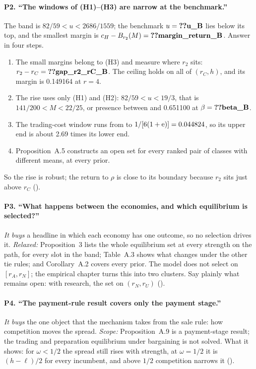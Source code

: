 \paragraph{P2. ``The windows of (H1)--(H3) are narrow at the benchmark.''}
The band is \(82/59<u<2686/1559\); the benchmark \(u=\reg{u_B}\) lies  below its top, and the
smallest margin is \(c_H-B_{r_2}(M)=\reg{margin_return_B}\). Answer in four steps.
\begin{enumerate}[nosep]
\item The small margins belong to (H3) and measure where \(r_2\) sits: \(r_2-r_C=\reg{gap_r2_rC_B}\). The ceiling
holds on all of \((r_C,h)\), and its margin is 0.149164 at \(r=4\). %
\item The rise uses only (H1) and (H2): \(82/59<u<19/3\), that is \(141/200<M<22/25\), or presence between
 and 0.651100 at \(\beta=\reg{beta_B}\). %
\item The trading-cost window runs from  to \(1/[6(1+\mathrm{e})]=0.044824\), %
so its upper end is about 2.69 times its lower end. %
\item Proposition~A.5 constructs an open set for every ranked pair of classes with different means, at every
prior.
\end{enumerate}
So the rise is robust; the return to \(\rho\) is close to its boundary because \(r_2\) sits just above \(r_C\)
().

\paragraph{P3. ``What happens between the economies, and which equilibrium is selected?''}
\emph{It buys} a headline in which each economy has one outcome, so no selection drives it. \emph{Relaxed:}
Proposition~3 lists the whole equilibrium set at every strength on the path, for every slot in the band;
Table~A.3 shows what changes under the other tie rules; and Corollary~A.2 covers every prior. The model does not select on \([r_A,r_N]\); the empirical
chapter turns this into two clusters. Say plainly what remains open: with research, the set on \((r_N,r_U)\)
().

\paragraph{P4. ``The payment-rule result covers only the payment stage.''}
\emph{It buys} the one object that the mechanism takes from the sale rule: how competition moves the spread.
\emph{Scope:} Proposition~A.9 is a payment-stage result; the trading and preparation equilibrium under bargaining is
not solved. What it shows: for \(\omega<1/2\) the spread still rises with strength, at \(\omega=1/2\) it is
\((h-\ell)/2\) for every incumbent, and above \(1/2\) competition narrows it ().

